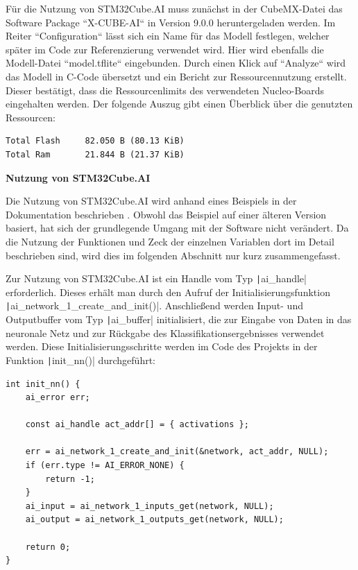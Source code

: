 Für die Nutzung von STM32Cube.AI muss zunächst in der CubeMX-Datei das Software Package ``X-CUBE-AI`` in Version 9.0.0 heruntergeladen werden. Im Reiter ``Configuration`` lässt sich ein Name für das Modell festlegen, welcher später im Code zur Referenzierung verwendet wird. Hier wird ebenfalls die Modell-Datei ``model.tflite`` eingebunden. Durch einen Klick auf ``Analyze`` wird das Modell in C-Code übersetzt und ein Bericht zur Ressourcennutzung erstellt. Dieser bestätigt, dass die Ressourcenlimits des verwendeten Nucleo-Boards eingehalten werden. Der folgende Auszug gibt einen Überblick über die genutzten Ressourcen:

\begin{verbatim}
Total Flash		82.050 B (80.13 KiB)
Total Ram  		21.844 B (21.37 KiB)
\end{verbatim}



\textbf{Nutzung von STM32Cube.AI}

Die Nutzung von STM32Cube.AI wird anhand eines Beispiels in der Dokumentation beschrieben \cite{stm32-cube-ai-documentation}. Obwohl das Beispiel auf einer älteren Version basiert, hat sich der grundlegende Umgang mit der Software nicht verändert. Da die Nutzung der Funktionen und Zeck der einzelnen Variablen dort im Detail  beschrieben sind, wird dies im folgenden Abschnitt nur kurz zusammengefasst.

Zur Nutzung von STM32Cube.AI ist ein Handle vom Typ \texttt|ai_handle| erforderlich. Dieses erhält man durch den Aufruf der Initialisierungsfunktion \texttt|ai_network_1_create_and_init()|. Anschließend werden Input- und Outputbuffer vom Typ \texttt|ai_buffer| initialisiert, die zur Eingabe von Daten in das neuronale Netz und zur Rückgabe des Klassifikationsergebnisses verwendet werden. Diese Initialisierungsschritte werden im Code des Projekts in der Funktion \texttt|init_nn()| durchgeführt:

\begin{verbatim}
int init_nn() {
	ai_error err;

	const ai_handle act_addr[] = { activations };

	err = ai_network_1_create_and_init(&network, act_addr, NULL);
	if (err.type != AI_ERROR_NONE) {
		return -1;
	}
	ai_input = ai_network_1_inputs_get(network, NULL);
	ai_output = ai_network_1_outputs_get(network, NULL);

	return 0;
}
\end{verbatim}

